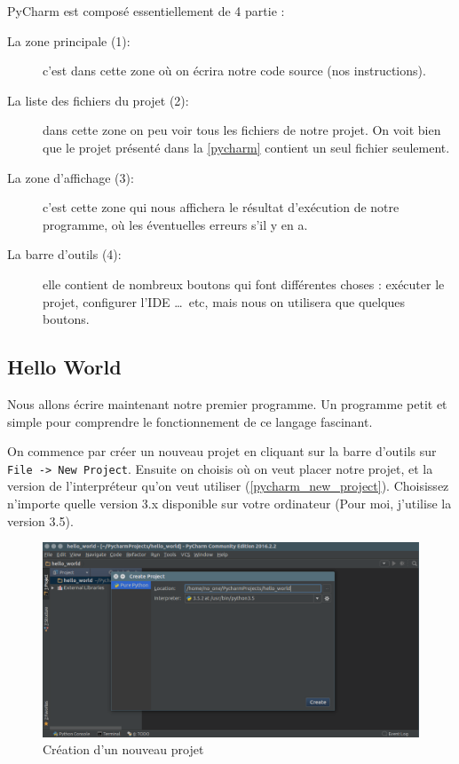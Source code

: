 \documentclass[12pt]{article}
\newcommand{\code}[1]{\colorbox{light-gray}{\texttt{#1}}}
\begin{document}
        PyCharm est composé essentiellement de 4 partie :
        \begin{description}
            \item[La zone principale (1):] c'est dans cette zone où on écrira notre code source (nos instructions).
            \item[La liste des fichiers du projet (2):] dans cette zone on peu voir tous les fichiers de notre projet. 
                On voit bien que le projet présenté dans la \autoref{pycharm} contient un seul fichier seulement.
            \item[La zone d'affichage (3):] c'est cette zone qui nous affichera le résultat d'exécution de notre 
                programme, où les éventuelles erreurs s'il y en a.
            \item[La barre d'outils (4):] elle contient de nombreux boutons qui font différentes choses : exécuter 
            le projet, configurer l'IDE \ldots\ etc, mais nous on utilisera que quelques boutons.
        \end{description}

    \subsection{Hello World}
        Nous allons écrire maintenant notre premier programme. Un programme petit et simple pour comprendre le 
        fonctionnement de ce langage fascinant.

        On commence par créer un nouveau projet en cliquant sur la barre d'outils sur \code{File -> New Project}. Ensuite on choisis où on veut placer notre projet, et la version de l'interpréteur qu'on veut utiliser
        (\autoref{pycharm_new_project}). Choisissez n'importe quelle version 3.x disponible sur votre ordinateur
        (Pour moi, j'utilise la version 3.5).

        \begin{figure}[H]
            \centering
            \includegraphics[width=\linewidth]{img/9_new_project.png}
            \caption{Création d'un nouveau projet}
            \label{pycharm_new_project}
        \end{figure}
\end{document}
